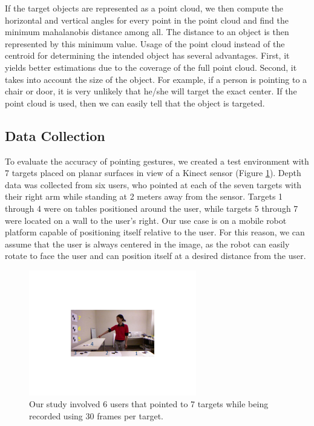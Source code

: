 If the target objects are represented as a point cloud, we then compute the horizontal and vertical angles for every point in the point cloud and find the minimum mahalanobis distance among all. The distance to an object is then represented by this minimum value. Usage of the point cloud instead of the centroid for determining the intended object has several advantages. First, it yields better estimations due to the coverage of the full point cloud. Second, it takes into account the size of the object. For example, if a person is pointing to a chair or door, it is very unlikely that he/she will target the exact center. If the point cloud is used, then we can easily tell that the object is targeted.

 
\subsection{Data Collection}
\label{sec:pointing_data_collection}

To evaluate the accuracy of pointing gestures, we created a test environment with 7 targets placed on planar surfaces in view of a Kinect sensor (Figure \ref{fig:ground_truth_targets}). Depth data was collected from six users, who pointed at each of the seven targets with their right arm while standing at 2 meters away from the sensor. Targets 1 through 4 were on tables positioned around the user, while targets 5 through 7 were located on a wall to the user's right. Our use case is on a mobile robot platform capable of positioning itself relative to the user.  For this reason, we can assume that the user is always centered in the image, as the robot can easily rotate to face the user and can position itself at a desired distance from the user.

\begin{figure}[ht!]
\centering
\includegraphics[width=0.65\textwidth]{pics/data_collection_crop}
\caption{Our study involved 6 users that pointed to 7 targets while being recorded using 30 frames per target.}
\label{fig:ground_truth_targets}
\end{figure}

